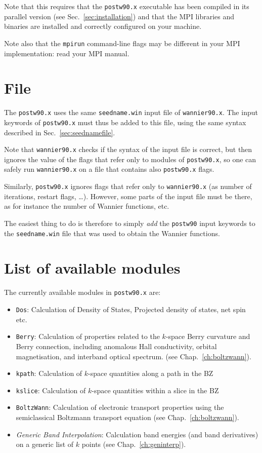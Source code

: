 Note that this requires that the {\tt postw90.x} executable has been
compiled in its parallel version (see Sec.~\ref{sec:installation}) and
that the MPI libraries and binaries are installed and correctly
configured on your machine.

Note also that the {\tt mpirun} command-line flags may be different in your MPI implementation: read your MPI manual.


\section{ File}
The \texttt{postw90.x} uses the same \texttt{seedname.win} input file
of \texttt{wannier90.x}. The input keywords of \texttt{postw90.x} must
thus be added to this file, using the same syntax described in
Sec.~\ref{sec:seednamefile}. 

Note that \texttt{wannier90.x} checks if the syntax of the input file
is correct, but then ignores the value of the flags that refer only to
modules of \texttt{postw90.x}, so one can safely run
\texttt{wannier90.x} on a file that contains also \texttt{postw90.x}
flags.

Similarly, \texttt{postw90.x} ignores flags that refer only to
\texttt{wannier90.x} (as number of iterations, restart flags,
\ldots). However, some parts of the input file must be there, as for
instance the number of Wannier functions, etc.

The easiest thing to do
is therefore to simply \emph{add} the \texttt{postw90} input keywords to
the \texttt{seedname.win} file that was used
to obtain the Wannier functions.

\section{List of available modules}
The currently available modules in \texttt{postw90.x} are:
\begin{itemize}
\item \texttt{Dos}: Calculation of Density of States, Projected
  density of states, net spin etc.
\item \texttt{Berry}: Calculation of properties related to the
  $k$-space Berry curvature and Berry connection, including anomalous
  Hall conductivity, orbital magnetisation, and interband optical
  spectrum.  (see Chap.~\ref{ch:boltzwann}).
\item \texttt{kpath}: Calculation of $k$-space quantities along a path
  in the BZ
\item \texttt{kslice}: Calculation of $k$-space quantities within a
  slice in the BZ
\item \texttt{BoltzWann}: Calculation of electronic transport
  properties using the semiclassical Boltzmann transport equation (see Chap.~\ref{ch:boltzwann}).
\item \emph{Generic Band Interpolation}: Calculation band energies (and band
  derivatives) on a generic list of $k$ points (see Chap.~\ref{ch:geninterp}).
\end{itemize}

